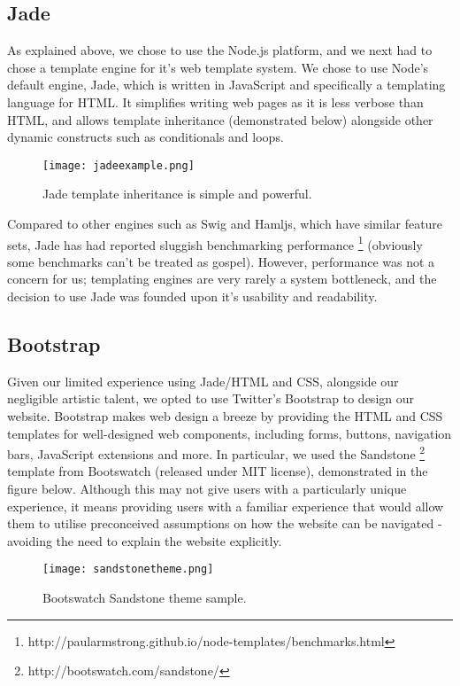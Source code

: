 \subsection{Jade}
As explained above, we chose to use the Node.js platform, and we next had to chose a template engine for it's web template system. We chose to use Node's default engine, Jade, which is written in JavaScript and specifically a templating language for HTML. It simplifies writing web pages as it is less verbose than HTML, and allows template inheritance (demonstrated below) alongside other dynamic constructs such as conditionals and loops.
\vspace{-2mm}
\begin{figure}[H]
\centering
\texttt{[image: jadeexample.png]}
\caption{Jade template inheritance is simple and powerful.}
\end{figure}

\noindent Compared to other engines such as Swig and Hamljs, which have similar feature sets, Jade has had reported sluggish benchmarking performance \footnote{http://paularmstrong.github.io/node-templates/benchmarks.html} (obviously some benchmarks can't be treated as gospel). However, performance was not a concern for us; templating engines are very rarely a system bottleneck, and the decision to use Jade was founded upon it's usability and readability.

\subsection{Bootstrap}
Given our limited experience using Jade/HTML and CSS, alongside our negligible artistic talent, we opted to use Twitter's Bootstrap to design our website. Bootstrap makes web design a breeze by providing the HTML and CSS templates for well-designed web components, including forms, buttons, navigation bars, JavaScript extensions and more. In particular, we used the Sandstone \footnote{http://bootswatch.com/sandstone/} template from Bootswatch (released under MIT license), demonstrated in the figure below. Although this may not give users with a particularly unique experience, it means providing users with a familiar experience that would allow them to utilise preconceived assumptions on how the website can be navigated - avoiding the need to explain the website explicitly.

\begin{figure}[H]
\centering
\texttt{[image: sandstonetheme.png]}
\caption{Bootswatch Sandstone theme sample.}
\end{figure}

